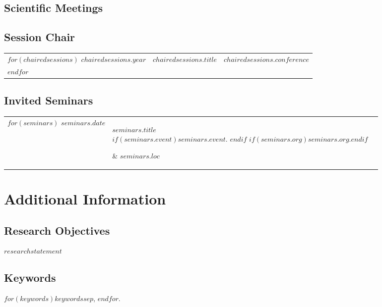 \documentclass[martgin, line]{article}
\begin{document}
\subsection*{Scientific Meetings}

\begin{enumerate}
  
\end{enumerate}

\subsection*{Session Chair}

\setlength{\extrarowheight}{.25em}
\begin{longtable}[l]{lll}
  $for(chairedsessions)$
  $chairedsessions.year$&
  $chairedsessions.title$&
  $chairedsessions.conference$\\
  $endfor$
\end{longtable}
\setlength{\extrarowheight}{0em}

\subsection*{Invited Seminars}

\setlength{\extrarowheight}{.75em}
\begin{longtable}[l]{lp{3.75in}l}
  $for(seminars)$
  $seminars.date$&
  \parbox[t]{3.75in} { $seminars.title$\\
    \scriptsize{%
      $if(seminars.event)$\textit{$seminars.event$}. $endif$%
      $if(seminars.org)$$seminars.org$.$endif$%
    }} & $seminars.loc$\\
  $endfor$
\end{longtable}
\setlength{\extrarowheight}{0em}

\section*{Additional Information}

\subsection*{Research Objectives}

$researchstatement$

\subsection*{Keywords}

$for(keywords)$$keywords$$sep$, $endfor$.
\end{document}
